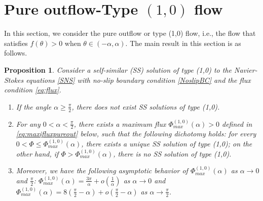 \documentclass[reqno,12pt]{amsart}
\newtheorem{pro}[theorem]{Proposition}
\begin{document}








\section{Pure outflow-Type $(1, 0)$ flow}\label{Sectionpureoutflow}

In this section, we consider the pure outflow or type (1,0) flow, i.e., the flow that satisfies $f(\theta)>0$ when $\theta \in (-\alpha, \alpha)$. 
The main result in this section is as follows.
\begin{pro}\label{Lemmapureoutflow2}
Consider a self-similar (SS) solution of type (1,0) to the Navier-Stokes equations \eqref{SNS} with no-slip boundary condition \eqref{NoslipBC} and the flux condition \eqref{eq:flux}.
\begin{enumerate}
\item 
If the angle $\alpha \geq \frac{\pi}{2}$, there does not exist SS solutions of type (1,0).
\item 
For any $0<\alpha < \frac{\pi}{2}$, there exists a maximum flux $\Phi_{max}^{(1,0)}(\alpha)>0$ defined in \eqref{eq:maxifluxpureout} below, such that the following dichotomy holds: for every $0<\Phi \leq  \Phi_{max}^{(1, 0)} (\alpha)$, there exists a unique SS solution of type (1,0); on the other hand, if $\Phi > \Phi_{max}^{(1, 0)}(\alpha)$, there is no SS solution of type (1,0). 
\item 
Moreover, we have the following asymptotic behavior of
  $\Phi_{max}^{(1,0)}(\alpha)$ as $\alpha \to 0$ and $\frac{\pi}{2}$: $\Phi_{max}^{(1,0)}(\alpha)=  \frac{3\pi}{\alpha} + o(\frac{1}{\alpha})$ as $\alpha\to 0$ and
            $\Phi^{(1,0)}_{max} (\alpha) = 8\left(\frac{\pi}{2}-\alpha\right)  + o \left(\frac{\pi}{2}-\alpha \right) $ as $\alpha \to \frac{\pi}{2}$.
\end{enumerate}
\end{pro}
\end{document}
